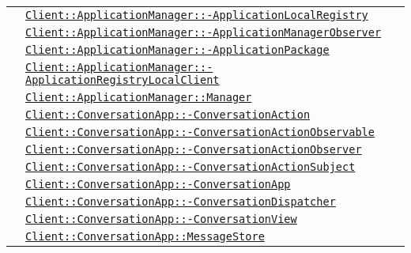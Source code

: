 \begin{longtable}{|>{\centering}m{3cm}|m{10cm}<{\centering}|}
& \hyperref[Client::ApplicationManager::ApplicationLocalRegistry]{\texttt{Client::ApplicationManager::-\linebreak ApplicationLocalRegistry}}\\
& \hyperref[Client::ApplicationManager::ApplicationManagerObserver]{\texttt{Client::ApplicationManager::-\linebreak ApplicationManagerObserver}}\\
& \hyperref[Client::ApplicationManager::ApplicationPackage]{\texttt{Client::ApplicationManager::-\linebreak ApplicationPackage}}\\
& \hyperref[Client::ApplicationManager::ApplicationRegistryLocalClient]{\texttt{Client::ApplicationManager::-\linebreak ApplicationRegistryLocalClient}}\\
& \hyperref[Client::ApplicationManager::Manager]{\texttt{Client::ApplicationManager::Manager}}\\
& \hyperref[Client::ConversationApp::ConversationAction]{\texttt{Client::ConversationApp::-\linebreak ConversationAction}}\\
& \hyperref[Client::ConversationApp::ConversationActionObservable]{\texttt{Client::ConversationApp::-\linebreak ConversationActionObservable}}\\
& \hyperref[Client::ConversationApp::ConversationActionObserver]{\texttt{Client::ConversationApp::-\linebreak ConversationActionObserver}}\\
& \hyperref[Client::ConversationApp::ConversationActionSubject]{\texttt{Client::ConversationApp::-\linebreak ConversationActionSubject}}\\
& \hyperref[Client::ConversationApp::ConversationApp]{\texttt{Client::ConversationApp::-\linebreak ConversationApp}}\\
& \hyperref[Client::ConversationApp::ConversationDispatcher]{\texttt{Client::ConversationApp::-\linebreak ConversationDispatcher}}\\
& \hyperref[Client::ConversationApp::ConversationView]{\texttt{Client::ConversationApp::-\linebreak ConversationView}}\\
& \hyperref[Client::ConversationApp::MessageStore]{\texttt{Client::ConversationApp::MessageStore}}\\

\end{longtable}
